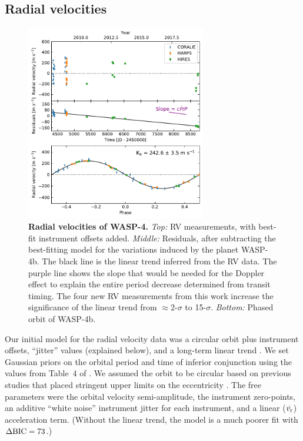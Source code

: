 \documentclass[12pt,twocolumn,tighten]{aastex62}
\begin{document}
\subsection{Radial velocities}

\begin{figure}[t]
	\begin{center}
		\leavevmode
		\includegraphics[width=0.7\textwidth]{f2.pdf}
	\end{center}
	\vspace{-0.7cm}
	\caption{
    {\bf Radial velocities of WASP-4.}
    {\it Top:} RV measurements, with best-fit instrument offsets
    added. 
    {\it Middle:}
    Residuals, after subtracting the
    best-fitting model for the variations
    induced by the planet WASP-4b. The black line is the linear trend
    inferred from the RV data.
    The purple line shows the slope that would be needed for the Doppler effect
    to explain the entire period decrease determined from transit timing.
    The four
    new RV measurements from this work increase the
    significance of the linear trend from $\approx$2-$\sigma$
    to 15-$\sigma$.
    {\it Bottom:}
    Phased orbit of WASP-4b.
	\label{fig:rvs}
  \vspace{-0.0cm}
	}
\end{figure}

Our initial model for the radial velocity data was a circular orbit
plus instrument offsets, ``jitter'' values (explained below), and a long-term linear trend
\citep[][\texttt{radvel}]{fulton_radvel_2018}.  We set Gaussian priors
on the orbital period and time of inferior conjunction using the
values from Table~4 of .
We assumed the orbit to be circular based on previous studies
that placed stringent upper limits on the eccentricity \citep{beerer_secondary_2011,knutson_friends_2014,bonomo_gaps_2017}.
The free parameters were the orbital velocity semi-amplitude, the instrument
zero-points, an additive ``white noise'' instrument jitter for each
instrument,
and a linear ($\dot{v_{\rm r}}$) acceleration term.  (Without the linear
trend, the model is a much poorer fit with $\Delta {\rm BIC}=73$.)
\end{document}
